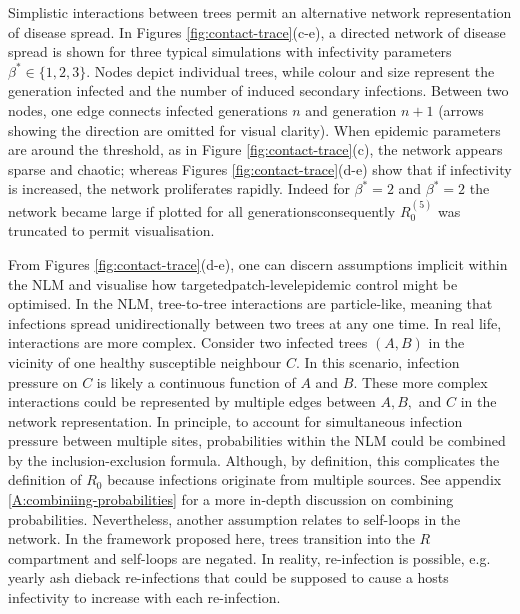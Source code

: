 Simplistic interactions between trees permit an alternative network representation of disease spread.
In Figures \ref{fig:contact-trace}(c-e), a directed network of disease spread is shown for three typical simulations with infectivity parameters $\beta^* \in \lbrace 1, 2, 3 \rbrace$.
Nodes depict individual trees, while colour and size represent the generation infected and the number of induced secondary infections.
Between two nodes, one edge connects infected generations $n$  and generation $n+1$ (arrows showing the direction are omitted for visual clarity). 
When epidemic parameters are around the threshold, as in Figure \ref{fig:contact-trace}(c), the network appears sparse and chaotic;
whereas Figures \ref{fig:contact-trace}(d-e) show that if infectivity is increased, the network proliferates rapidly. 
Indeed for $\beta^*=2$ and $\beta^*=2$ the network became large if plotted for all generations\textemdash consequently $R_0^{(5)}$ was truncated to permit visualisation.

From Figures \ref{fig:contact-trace}(d-e), one can discern assumptions implicit within the NLM and visualise how targeted\textemdash patch-level\textemdash epidemic control might be optimised.
In the NLM, tree-to-tree interactions are particle-like, meaning that infections spread unidirectionally between two trees at any one time.
In real life, interactions are more complex.
Consider two infected trees $(A, B)$ in the vicinity of one healthy susceptible neighbour $C$. In this scenario, infection pressure on $C$ is likely a continuous function of $A$ and $B$.
These more complex interactions could be represented by multiple edges between $A, B,$ and $C$ in the network representation.
In principle, to account for simultaneous infection pressure between multiple sites, probabilities within the NLM could be combined by the inclusion-exclusion formula.
Although, by definition, this complicates the definition of $R_0$ because infections originate from multiple sources.
See appendix \ref{A:combiniing-probabilities} for a more in-depth discussion on combining probabilities.
Nevertheless, another assumption relates to self-loops in the network.
In the framework proposed here, trees transition into the $R$ compartment and self-loops are negated.
In reality, re-infection is possible\textemdash, e.g. yearly ash dieback re-infections \cite{gross2014h}\textemdash that could be supposed to cause a hosts infectivity to increase with each re-infection.


